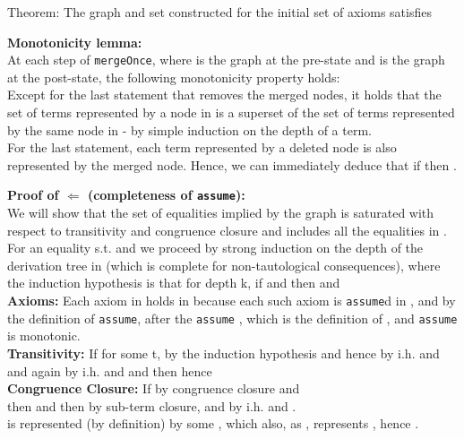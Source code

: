 \begin{theorem}
Theorem: The graph  and set  constructed for the initial set of axioms  satisfies\\ 

\noindent
\textbf{Monotonicity lemma:} \\
At each step of \lstinline|mergeOnce|, where  is the graph at the pre-state and  is the graph at the post-state,
the following monotonicity property holds:\\
Except for the last statement that removes the merged nodes, it holds that the set of terms represented by a node in  is a superset of the set of terms represented by the same node in  - by simple induction on the depth of a term.\\
For the last statement, each term represented by a deleted node is also represented by the merged node.
Hence, we can immediately deduce that if  then .

\noindent
\textbf{Proof of $\Leftarrow$ (completeness of \lstinline|assume|):} \\
We will show that the set of equalities implied by the graph is saturated with respect to transitivity and congruence closure and includes all the equalities in . \\
For an equality  s.t.  and  we proceed by strong induction on the depth of the derivation tree in  (which is complete for non-tautological consequences), 
where the induction hypothesis is that for depth k, if  and  then  and  \\
\textbf{Axioms:} Each axiom  in  holds in  because each such axiom is \lstinline{assume}d in , and by the definition of \lstinline{assume}, after the \lstinline{assume} , which is the definition of ,
and \lstinline|assume| is monotonic.\\
\textbf{Transitivity:} If  for some t, by the induction hypothesis  and hence by i.h.  and  and again by i.h.  and  and then  hence \\
\textbf{Congruence Closure:} If  by congruence closure and \\
 then  and then by sub-term closure,  and by i.h. 
 and .\\
 is represented (by definition) by some \GFA{} , which also, as , represents ,
hence .\\
\QED


\end{theorem}
